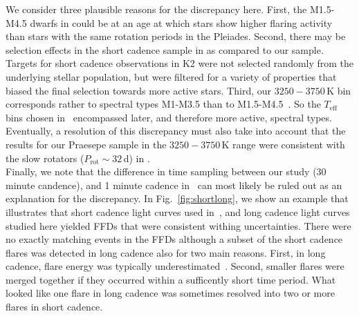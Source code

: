 \documentclass{aa}
\begin{document}
We consider three plausible reasons for the discrepancy here. First, the M1.5-M4.5 dwarfs in \citet{raetz2020} could be at an age at which stars show higher flaring activity than stars with the same rotation periods in the Pleiades. Second, there may be selection effects in the short cadence sample in \citet{raetz2020} as compared to our sample. Targets for short cadence observations in K2 were not selected randomly from the underlying stellar population, but were filtered for a variety of properties that biased the final selection towards more active stars. Third, our $3250-3750\,$K bin corresponds rather to spectral types M1-M3.5 than to M1.5-M4.5~\citep{pecaut_intrinsic_2013}. So the $T_\mathrm{eff}$ bins chosen in~\citet{raetz2020} encompassed later, and therefore more active, spectral types. Eventually, a resolution of this discrepancy must also take into account that the results for our Praesepe sample in the  $3250-3750\,$K range were consistent with the slow rotators ($P_\mathrm{rot}\sim32\,$d) in \citet{raetz2020}.
\\
Finally, we note that the difference in time sampling between our study (30 minute candence), and 1 minute cadence in~\citet{raetz2020} can most likely be ruled out as an explanation for the discrepancy. In Fig.~\ref{fig:shortlong}, we show an example that illustrates that short cadence light curves used in~\citet{raetz2020}, and long cadence light curves studied here yielded FFDs that were consistent withing uncertainties. There were no exactly matching events in the FFDs although a subset of the short cadence flares was detected in long cadence also for two main reasons. First, in long cadence, flare energy was typically underestimated~\citep{yang_flaresampling_2018}. Second, smaller flares were merged together if they occurred within a sufficently short time period. What looked like one flare in long cadence was sometimes resolved into two or more flares in short cadence.
\end{document}
